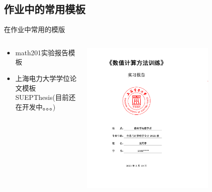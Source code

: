 \subsection{作业中的常用模板}
\begin{frame}{在作业中常用的模版}
    \begin{columns}[c]
    \begin{column}{.45\textwidth}
        \begin{itemize}
            \item math201实验报告模板 
            \item 上海电力大学学位论文模板SUEPThesis(目前还在开发中。。。) 
        \end{itemize}
    \end{column}
    \begin{column}{.45\textwidth}
        \includegraphics[width=0.75\textwidth]{examples/math201.png}
      \end{column}
    \end{columns}
\end{frame}
